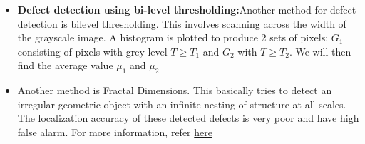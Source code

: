 \documentclass[]{article}
\begin{document}
\begin{itemize}
\item \textbf{Defect detection using bi-level thresholding:}Another method for defect detection is bilevel thresholding. This involves scanning across the width  of the grayscale image. A histogram is plotted to produce 2 sets of pixels: $G_1$ consisting of pixels with grey level $T\geq T_1$ and $G_2$ with $T\geq T_2$. We will then find the average value $\mu_1$ and $\mu_2$  

\item Another method is Fractal Dimensions. This basically tries to detect an irregular geometric object with an infinite nesting of structure at all scales. The localization accuracy of these detected defects is very poor and have high false alarm. For more information, refer \href{http://www.vanderbilt.edu/AnS/psychology/cogsci/chaos/workshop/Fractals.html}{here}



\end{itemize} 
\end{document}
